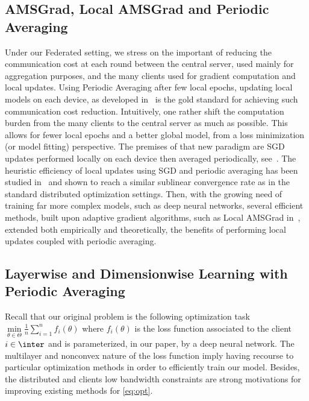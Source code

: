 \documentclass[11pt]{article}
\begin{document}
\vspace{-0.1in}
\subsection{AMSGrad, Local AMSGrad and Periodic Averaging}
Under our Federated setting, we stress on the important of reducing the communication cost at each round between the central server, used mainly for aggregation purposes, and the many clients used for gradient computation and local updates.
Using Periodic Averaging after few local epochs, updating local models on each device, as developed in~\citep{mcmahan2017communication} is the gold standard for achieving such communication cost reduction.
Intuitively, one rather shift the computation burden from the many clients to the central server as much as possible. This allows for fewer local epochs and a better global model, from a loss minimization (or model fitting) perspective.
The premises of that new paradigm are SGD updates performed locally on each device then averaged periodically, see~\citep{konevcny2016federated, zhou2017convergence}.
The heuristic efficiency of local updates using SGD and periodic averaging has been studied in~\citep{stich2018local,yu2019linear} and shown to reach a similar sublinear convergence rate as in the standard distributed optimization settings.
Then, with the growing need of training far more complex models, such as deep neural networks, several efficient methods, built upon adaptive gradient algorithms, such as Local AMSGrad in~\citep{chen2020toward}, extended both empirically and theoretically, the benefits of performing local updates coupled with periodic averaging.


\vspace{-0.1in}
\subsection{Layerwise and Dimensionwise Learning with Periodic Averaging}

Recall that our original problem is the following optimization task $\min \limits_{\theta \in \Theta} \frac{1}{n} \sum_{i=1}^n f_i(\theta)$ where $f_i(\theta)$ is the loss function associated to the client $i \in \inter$ and is parameterized, in our paper, by a deep neural network.
The multilayer and nonconvex nature of the loss function imply having recourse to particular optimization methods in order to efficiently train our model.
Besides, the distributed and clients low bandwidth constraints are strong motivations for improving existing methods for \eqref{eq:opt}.  
\end{document}
